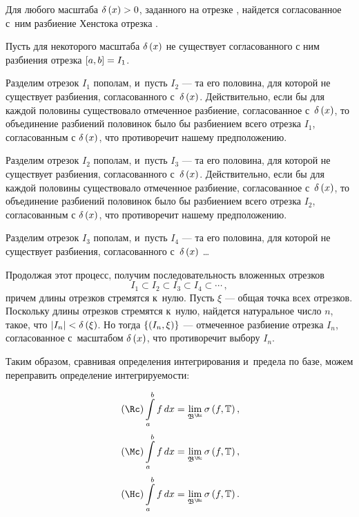 \documentclass[draft]{article}
\begin{document}
\bigskip


Для любого масштаба $\dexgz$, заданного на отрезке \ab, найдется
согласованное с~ним разбиение Хенстока отрезка \ab.

\pr

Пусть для некоторого масштаба $\dex$ не существует согласованного с
ним разбиения отрезка $\segab=I_1$.

\smallskip

Разделим отрезок $I_1$ пополам, и~пусть $I_2$ --- та его половина,
для которой не существует разбиения, согласованного с~$\dex$.
Действительно, если бы для каждой половины существовало отмеченное
разбиение, согласованное с~$\dex$, то объединение разбиений
половинок было бы разбиением всего отрезка $I_1$, согласованным с
$\dex$, что противоречит нашему предположению.

\smallskip

Разделим отрезок $I_2$ пополам, и~пусть $I_3$ --- та его половина,
для которой не существует разбиения, согласованного с~$\dex$.
Действительно, если бы для каждой половины существовало отмеченное
разбиение, согласованное с~$\dex$, то объединение разбиений
половинок было бы разбиением всего отрезка $I_2$, согласованным с
$\dex$, что противоречит нашему предположению.

\smallskip

Разделим отрезок $I_3$ пополам, и~пусть $I_4$ --- та его половина,
для которой не существует разбиения, согласованного с~$\dex$ \dots

\smallskip

Продолжая этот процесс, получим последовательность вложенных
отрезков
$$I_1\subset I_2\subset I_3\subset I_4\subset\cdots\,,$$
причем длины отрезков стремятся к~нулю. Пусть $\xi$ --- общая точка
всех отрезков. Поскольку длины отрезков стремятся к~нулю, найдется
натуральное число $n$, такое, что $\left|I_n\right|<\de\at(\xi)$. Но
тогда $\left\{\left(I_n,\xi \right)\right\}$ --- отмеченное разбиение отрезка
$I_n$, согласованное с~масштабом $\dex$, что противоречит выбору
$I_n$.

\prlm

\bigskip

Таким образом, сравнивая определения интегрирования и~предела по
базе, можем переправить определение интегрируемости:

$$\riman\intabfdx=\lim_{\baseriman}\isfT,$$
$$\macsh\intabfdx=\lim_{\basemacsh}\isfT,$$
$$\kurzh\intabfdx=\lim_{\basekurzh}\isfT.$$
\end{document}
